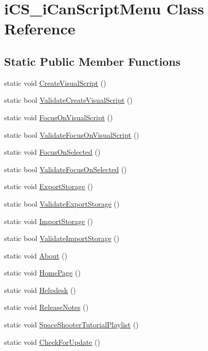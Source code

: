 \hypertarget{classi_c_s__i_can_script_menu}{\section{i\+C\+S\+\_\+i\+Can\+Script\+Menu Class Reference}
\label{classi_c_s__i_can_script_menu}
}
\subsection*{Static Public Member Functions}
\begin{DoxyCompactItemize}
\item 
static void \hyperlink{classi_c_s__i_can_script_menu_a6f8b92ad02e84b7ac738d5d8dc7b1695}{Create\+Visual\+Script} ()
\item 
static bool \hyperlink{classi_c_s__i_can_script_menu_a6eb81347ff2b9ffdd84fedc823234fd5}{Validate\+Create\+Visual\+Script} ()
\item 
static void \hyperlink{classi_c_s__i_can_script_menu_a94a0c3e41dc0a5a16654bd85cb12e5e4}{Focus\+On\+Visual\+Script} ()
\item 
static bool \hyperlink{classi_c_s__i_can_script_menu_ac82821e4a62f27a704ad7771942c8c4c}{Validate\+Focus\+On\+Visual\+Script} ()
\item 
static void \hyperlink{classi_c_s__i_can_script_menu_a7a76ae7f04ab7d0b2e1233fa68f4a57e}{Focus\+On\+Selected} ()
\item 
static bool \hyperlink{classi_c_s__i_can_script_menu_a646ad07997e24896f078a518de60f614}{Validate\+Focus\+On\+Selected} ()
\item 
static void \hyperlink{classi_c_s__i_can_script_menu_a9fb91c635cf6640d85f8358620a8a504}{Export\+Storage} ()
\item 
static bool \hyperlink{classi_c_s__i_can_script_menu_a1e3e39042c66788fcbcd2a74696962ec}{Validate\+Export\+Storage} ()
\item 
static void \hyperlink{classi_c_s__i_can_script_menu_a491ca71c37538ad105f0300f4b4383e1}{Import\+Storage} ()
\item 
static bool \hyperlink{classi_c_s__i_can_script_menu_ab7852a44bf76a68ce33a1b5e1d56ead3}{Validate\+Import\+Storage} ()
\item 
static void \hyperlink{classi_c_s__i_can_script_menu_aeaa01be169dab3b75267425991fc6d04}{About} ()
\item 
static void \hyperlink{classi_c_s__i_can_script_menu_abf2d50cc024fbe044644914fe58dd0bd}{Home\+Page} ()
\item 
static void \hyperlink{classi_c_s__i_can_script_menu_a19c47671fbf82d7f83e5d4ebc1c24813}{Helpdesk} ()
\item 
static void \hyperlink{classi_c_s__i_can_script_menu_a5a75226bb203598750a1a359dbb2ccf7}{Release\+Notes} ()
\item 
static void \hyperlink{classi_c_s__i_can_script_menu_addf37cdb17da007a5615cadca4548b19}{Space\+Shooter\+Tutorial\+Playlist} ()
\item 
static void \hyperlink{classi_c_s__i_can_script_menu_a4cb0c4c966ccf00fa574dd66eb87222b}{Check\+For\+Update} ()
\end{DoxyCompactItemize}


